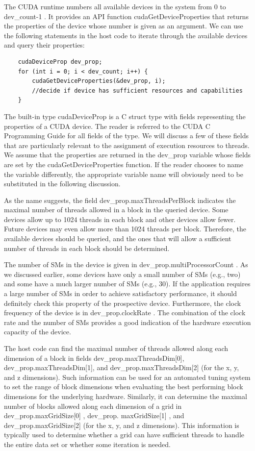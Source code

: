 \documentclass[11pt]{ctexart}
\begin{document}
The CUDA runtime numbers all available devices in the system from 0 to
dev\_count-1 . It provides an API function cudaGetDeviceProperties that returns the properties of the device whose number is given as an argument. We can use the following statements in the host code to iterate through the available devices and query their properties:

\begin{lstlisting}
	cudaDeviceProp dev_prop;
	for (int i = 0; i < dev_count; i++) {
		cudaGetDeviceProperties(&dev_prop, i);
		//decide if device has sufficient resources and capabilities
	}
\end{lstlisting}

The built-in type cudaDeviceProp is a C struct type with fields representing the properties of a CUDA device. The reader is referred to the CUDA C Programming Guide for all fields of the type. We will discuss a few of these fields that are particularly relevant to the assignment of execution resources to threads. We assume that the properties are returned in the dev\_prop variable whose fields are set by the cudaGetDeviceProperties function. If the reader chooses to name the variable differently,
the appropriate variable name will obviously need to be substituted in the following discussion.

As the name suggests, the field dev\_prop.maxThreadsPerBlock indicates the maximal number of threads allowed in a block in the queried device. Some devices allow up to 1024 threads in each block and other devices allow fewer. Future devices may even allow more than 1024 threads per block. Therefore, the available devices should be queried, and the ones that will allow a sufficient number of threads in each block should be determined. 

The number of SMs in the device is given in dev\_prop.multiProcessorCount . As we discussed earlier, some devices have only a small number of SMs (e.g., two) and some have a much larger number of SMs (e.g., 30). If the application requires a large number of SMs in order to achieve satisfactory performance, it should definitely
check this property of the prospective device. Furthermore, the clock frequency of the device is in dev\_prop.clockRate . The combination of the clock rate and the number of SMs provides a good indication of the hardware execution capacity of the device.

The host code can find the maximal number of threads allowed along each dimension of a block in fields dev\_prop.maxThreadsDim[0], dev\_prop.maxThreadsDim[1], and dev\_prop.maxThreadsDim[2] (for the x, y, and z dimensions).
Such information can be used for an automated tuning system to set the range of block dimensions when evaluating the best performing block dimensions for the  underlying hardware. Similarly, it can determine the maximal number of blocks allowed along each dimension of a grid in dev\_prop.maxGridSize[0] , dev\_prop.
maxGridSize[1] , and dev\_prop.maxGridSize[2] (for the x, y, and z dimensions). This information is typically used to determine whether a grid can have sufficient threads to handle the entire data set or whether some iteration is needed.
\end{document}
